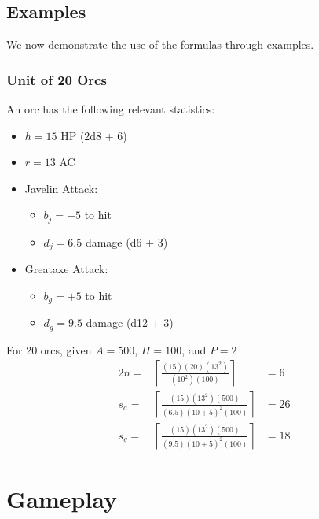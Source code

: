 \documentclass{article}
\begin{document}
\subsection{Examples}

We now demonstrate the use of the formulas through examples.

\subsubsection{Unit of 20 Orcs}

An orc has the following relevant statistics:
\begin{itemize}
    \item $h = 15$ HP (2d8 + 6)
    \item $r = 13$ AC
    \item Javelin Attack:
        \begin{itemize}
            \item $b_j = +5$ to hit
            \item $d_j = 6.5$ damage (d6 + 3)
        \end{itemize}
    \item Greataxe Attack:
        \begin{itemize}
            \item $b_g = +5$ to hit
            \item $d_g = 9.5$ damage (d12 + 3)
        \end{itemize}
\end{itemize}

For 20 orcs, given $A = 500$, $H = 100$, and $P = 2$
\begin{alignat*}{2}
    n   =&  
        \left\lceil
            \frac
                {(15) (20) (13^2)}
                {(10^2) (100)}
        \right\rceil
            &=  6
    \\
    s_a =&
        \left\lceil
            \frac
                {(15) (13^2) (500)}
                {(6.5) (10 + 5)^2 (100)}
        \right\rceil
            &=   26 \\
    s_g =&  
        \left\lceil
            \frac
                {(15) (13^2) (500)}
                {(9.5) (10 + 5)^2 (100)}
        \right\rceil
            &=  18
\end{alignat*}


\section{Gameplay}\label{sec:game}
\end{document}
